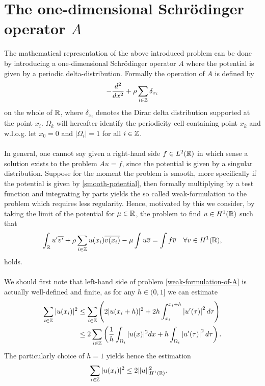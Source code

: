 \chapter{The one-dimensional Schrödinger operator $A$} \label{chap2}

The mathematical representation of the above introduced problem can be done by introducing a one-dimensional Schrödinger operator $A$ where the potential is given by a periodic delta-distribution. Formally the operation of $A$ is defined by
\begin{equation}
	- \frac{d^{2}}{dx^{2}} + \rho \sum_{i \in \mathbb{Z}} \delta_{x_{i}} \label{the-operator-A-formally}
\end{equation}
on the whole of $\mathbb{R}$, where $\delta_{x_{i}}$ denotes the Dirac delta distribution supported at the point $x_{i}$. $\Omega_{k}$ will hereafter identify the periodicity cell containing point $x_{k}$ and w.l.o.g. let $x_{0} = 0$ and $|\Omega_{i}| = 1$ for all $i \in \mathbb{Z}$.
~\\ ~\\  
In general, one cannot say given a right-hand side $f \in L^{2}(\mathbb{R})$ in which sense a solution exists to the problem $Au = f$, since the potential is given by a singular distribution. Suppose for the moment the problem is smooth, more specifically if the potential is given by \eqref{smooth-potential}, then formally multiplying by a test function and integrating by parts yields the so called weak-formulation to the problem which requires less regularity. Hence, motivated by this we consider, by taking the limit of the potential for $\mu \in \mathbb{R}$, the problem to find $u \in H^{1}(\mathbb{R})$ such that
\begin{equation}
	\int_{\mathbb{R}} u' \overline{v'} + \rho \sum_{i \in \mathbb{Z}} u(x_{i}) \overline{v(x_{i})} - \mu \int u \overline{v} = \int f \overline{v} \quad \forall v \in H^{1}(\mathbb{R}), \label{weak-formulation-of-A}
\end{equation}	
holds. 
~\\ ~\\
We should first note that left-hand side of problem \eqref{weak-formulation-of-A} is actually well-defined and finite, as for any $h \in (0, 1]$ we can estimate
\begin{align}
	\sum_{i \in \mathbb{Z}} |u(x_{i})|^{2} & \leq \sum_{i \in \mathbb{Z}} \left( 2 |u( x_{i} + h )|^{2} +  2 h \int_{x_{i}}^{x_{i} + h} \left| u'(\tau) \right|^{2} d\tau \right) \notag \\
		 & \leq 2 \sum_{i \in \mathbb{Z}} \left( \frac{1}{h} \int_{\Omega_{i}} |u( x )|^{2} dx + h \int_{\Omega_{i}} \left| u'(\tau) \right|^{2} d\tau \right). \label{preestimation-for-potential}
\end{align}
The particularly choice of $h = 1$ yields hence the estimation
\begin{align} 
		\sum_{i \in \mathbb{Z}} |u(x_{i})|^{2} & \leq 2 \| u \|^{2}_{H^{1}(\mathbb{R})}. \label{estimation-for-potential}
\end{align}

